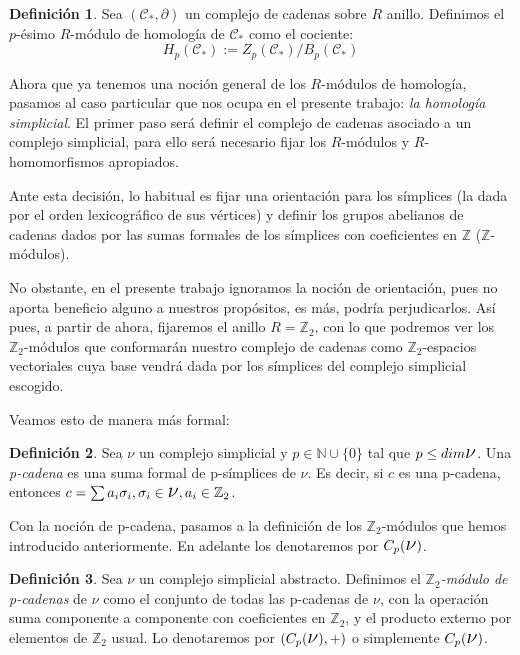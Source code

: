 \documentclass[12pt, a4paper, twoside]{book}
\numberwithin{equation}{section}
\theoremstyle{definition}
\newtheorem{defi}{Definición}
\theoremstyle{remark}
\theoremstyle{plain}
\begin{document}
	\begin{defi}
		Sea $(\mathcal{C}_{*},\partial)$ un complejo de cadenas sobre 
		$R$ anillo. Definimos el $p$-ésimo $R$-módulo de homología de
		$\mathcal{C}_{*}$ como el cociente:
		$$H_{p}(\mathcal{C}_{*}):=Z_{p}(\mathcal{C}_{*})/B_{p}(
		\mathcal{C}_{*})$$
	\end{defi}

	Ahora que ya tenemos una noción general de los $R$-módulos de 
	homología, pasamos al caso particular que nos ocupa en el presente 
	trabajo: \emph{la homología simplicial}. El primer paso será definir 
	el complejo de cadenas asociado a un complejo simplicial, para ello 
	será necesario fijar los $R$-módulos y $R$-homomorfismos apropiados.

	Ante esta decisión, lo habitual es fijar una orientación para los 
	símplices (la dada por el orden lexicográfico de sus vértices) y 
	definir los grupos abelianos de cadenas dados por las sumas formales 
	de los símplices con coeficientes en $\mathbb{Z}$ 
	($\mathbb{Z}$-módulos). 

	No obstante, en el presente trabajo ignoramos 
	la noción de orientación, pues no aporta beneficio alguno a nuestros 
	propósitos, es más, podría perjudicarlos. Así pues, a partir de ahora,
	fijaremos el anillo $R=\mathbb{Z}_{2}$, con lo que podremos ver los 
	$\mathbb{Z}_{2}$-módulos que conformarán nuestro complejo de cadenas 
	como $\mathbb{Z}_{2}$-espacios vectoriales cuya base vendrá dada por 
	los símplices del complejo simplicial escogido.

	Veamos esto de manera más formal:

	\begin{defi}
		Sea {\Large $\nu$} un complejo simplicial y $p \in \mathbb{N}
		\cup\{0\}$ 
		tal que $p\leq dim \text{{\Large $\nu$}}$. Una 
		\textit{p-cadena} es una suma formal de p-símplices de 
		{\Large $\nu$}. Es decir, si $c$ es una p-cadena, entonces 
		$c=\sum a_{i}\sigma_{i},\sigma_{i} \in \text{{\Large $\nu$}},
		a_{i} \in \mathbb{Z}_{2}$. 
	\end{defi}
	
	Con la noción de p-cadena, pasamos a la definición de los 
	$\mathbb{Z}_{2}$-módulos que hemos introducido anteriormente. En 
	adelante los denotaremos por $C_{p}(\text{{\Large $\nu$}})$. 

	\begin{defi}
		Sea {\Large $\nu$} un complejo simplicial abstracto. Definimos
		el \textit{$\mathbb{Z}_{2}$-módulo de p-cadenas} de 
		{\Large $\nu$} como el conjunto de todas las p-cadenas de 
		{\Large $\nu$}, con la operación suma componente a componente 
		con coeficientes en $\mathbb{Z}_{2}$, y el producto externo 
		por elementos de $\mathbb{Z}_{2}$ usual. Lo denotaremos por 
		$(C_{p}(\text{{\Large $\nu$}}), +)$ o simplemente 
		$C_{p}(\text{{\Large $\nu$}})$. 	
	\end{defi}
	
\end{document}
